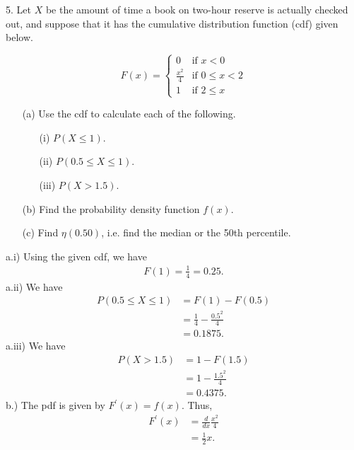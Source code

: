 \documentclass{report}
\begin{document}
 \pagebreak \bigbreak \noindent 
 \begin{mdframed}
     5. Let $X$ be the amount of time a book on two-hour reserve is actually checked out, and suppose that it has the cumulative distribution function (cdf) given below.

     \[
         F(x) = 
         \begin{cases} 
             0 & \text{if } x < 0 \\ 
             \frac{x^2}{4} & \text{if } 0 \leq x < 2 \\ 
             1 & \text{if } 2 \leq x 
         \end{cases}
     \]

     \begin{enumerate}
         \item[(a)] Use the cdf to calculate each of the following.
             \begin{enumerate}
                 \item[(i)] $P(X \leq 1)$.
                 \item[(ii)] $P(0.5 \leq X \leq 1)$.
                 \item[(iii)] $P(X > 1.5)$.
             \end{enumerate}
         \item[(b)] Find the probability density function $f(x)$.
         \item[(c)] Find $\eta(0.50)$, i.e. find the median or the 50th percentile.
     \end{enumerate}
 \end{mdframed}
 \bigbreak \noindent 
 a.i) Using the given cdf, we have
 \begin{align*}
     F(1) = \frac{1}{4} = 0.25
 .\end{align*}
 \bigbreak \noindent 
 a.ii) We have
 \begin{align*}
     P(0.5 \leq X \leq 1)  &= F(1) - F(0.5) \\
    &=\frac{1}{4} - \frac{0.5^{2}}{4} \\
    &=0.1875
 .\end{align*}
 \bigbreak \noindent 
 a.iii) We have
 \begin{align*}
     P(X > 1.5) &= 1-F(1.5) \\
                &= 1-\frac{1.5^{2}}{4} \\
                &=0.4375
 .\end{align*}
 \bigbreak \noindent 
 b.) The pdf is given by $F^{\prime}(x) = f(x)$. Thus, 
 \begin{align*}
     F^{\prime}(x) &= \frac{d}{dx}\frac{x^{2}}{4} \\
     &=\frac{1}{2}x
 .\end{align*}
\end{document}
